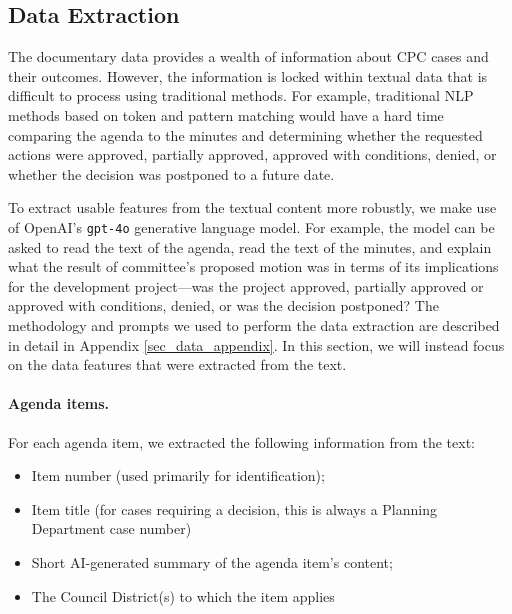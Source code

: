 \subsection{Data Extraction}

The documentary data provides a wealth of information about CPC cases and their outcomes. However, the information is locked within textual data that is difficult to process using traditional methods. For example, traditional NLP methods based on token and pattern matching would have a hard time comparing the agenda to the minutes and determining whether the requested actions were approved, partially approved, approved with conditions, denied, or whether the decision was postponed to a future date. 

To extract usable features from the textual content more robustly, we make use of OpenAI's \texttt{gpt-4o} generative language model. For example, the model can be asked to read the text of the agenda, read the text of the minutes, and explain what the result of committee's proposed motion was in terms of its implications for the development project---was the project approved, partially approved or approved with conditions, denied, or was the decision postponed? The methodology and prompts we used to perform the data extraction are described in detail in Appendix \ref{sec_data_appendix}. In this section, we will instead focus on the data features that were extracted from the text.

\paragraph{Agenda items.} For each agenda item, we extracted the following information from the text: 
\begin{itemize}[noitemsep, topsep=0pt]
\item Item number (used primarily for identification);
\item Item title (for cases requiring a decision, this is always a Planning Department case number)
\item Short AI-generated summary of the agenda item's content;
\item The Council District(s) to which the item applies
\end{itemize}

